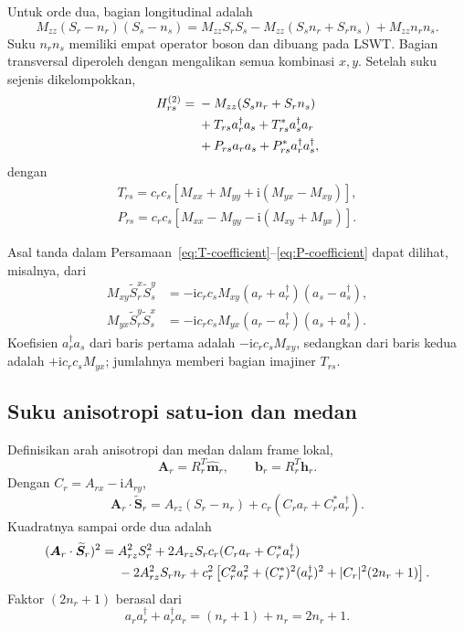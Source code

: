 \documentclass[11pt,a4paper]{article}
\newcommand{\ii}{\mathrm{i}}
\newcommand{\vS}{\bm S}
\newcommand{\vh}{\bm h}
\begin{document}
Untuk orde dua, bagian longitudinal adalah
\begin{equation}
M_{zz}(S_r-n_r)(S_s-n_s)
=M_{zz}S_rS_s-M_{zz}(S_sn_r+S_rn_s)+M_{zz}n_rn_s.
\end{equation}
Suku $n_rn_s$ memiliki empat operator boson dan dibuang pada LSWT. Bagian transversal diperoleh dengan mengalikan semua kombinasi $x,y$. Setelah suku sejenis dikelompokkan,
\begin{align}
H_{rs}^{(2)}={}&
-M_{zz}(S_sn_r+S_rn_s)\notag\\
&+T_{rs}a_r^\dagger a_s+T_{rs}^*a_s^\dagger a_r\notag\\
&+P_{rs}a_ra_s+P_{rs}^*a_r^\dagger a_s^\dagger,
\label{eq:bond-order2}
\end{align}
dengan
\begin{align}
\boxed{
T_{rs}=c_rc_s
\left[M_{xx}+M_{yy}+\ii(M_{yx}-M_{xy})\right],}
\label{eq:T-coefficient}\\
\boxed{
P_{rs}=c_rc_s
\left[M_{xx}-M_{yy}-\ii(M_{xy}+M_{yx})\right].}
\label{eq:P-coefficient}
\end{align}

Asal tanda dalam Persamaan~\eqref{eq:T-coefficient}--\eqref{eq:P-coefficient} dapat dilihat, misalnya, dari
\begin{align}
M_{xy}\widetilde S_r^x\widetilde S_s^y
&=-\ii c_rc_sM_{xy}(a_r+a_r^\dagger)(a_s-a_s^\dagger),\\
M_{yx}\widetilde S_r^y\widetilde S_s^x
&=-\ii c_rc_sM_{yx}(a_r-a_r^\dagger)(a_s+a_s^\dagger).
\end{align}
Koefisien $a_r^\dagger a_s$ dari baris pertama adalah $-\ii c_rc_sM_{xy}$, sedangkan dari baris kedua adalah $+\ii c_rc_sM_{yx}$; jumlahnya memberi bagian imajiner $T_{rs}$.

\subsection{Suku anisotropi satu-ion dan medan}

Definisikan arah anisotropi dan medan dalam frame lokal,
\begin{equation}
\bm A_r=R_r^T\widehat{\bm m}_r,
\qquad
\bm b_r=R_r^T\vh_r.
\end{equation}
Dengan $C_r=A_{rx}-\ii A_{ry}$,
\begin{equation}
\bm A_r\cdot\widetilde{\vS}_r
=A_{rz}(S_r-n_r)+c_r(C_ra_r+C_r^*a_r^\dagger).
\end{equation}
Kuadratnya sampai orde dua adalah
\begin{align}
(\bm A_r\cdot\widetilde{\vS}_r)^2
={}&A_{rz}^2S_r^2
+2A_{rz}S_rc_r(C_ra_r+C_r^*a_r^\dagger)\notag\\
&-2A_{rz}^2S_rn_r
+c_r^2\left[C_r^2a_r^2+(C_r^*)^2(a_r^\dagger)^2+|C_r|^2(2n_r+1)\right].
\label{eq:anisotropy-expansion}
\end{align}
Faktor $(2n_r+1)$ berasal dari
\begin{equation}
a_ra_r^\dagger+a_r^\dagger a_r
=(n_r+1)+n_r=2n_r+1.
\end{equation}
\end{document}
